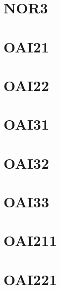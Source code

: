 \documentclass[10pt,a4paper,twoside]{report}
\begin{document}
\section{NOR3}

\clearpage



\section{OAI21}

\clearpage

\section{OAI22}

\clearpage

\section{OAI31}

\clearpage

\section{OAI32}

\clearpage

\section{OAI33}

\clearpage

\section{OAI211}

\clearpage

\section{OAI221}

\clearpage
\end{document}
